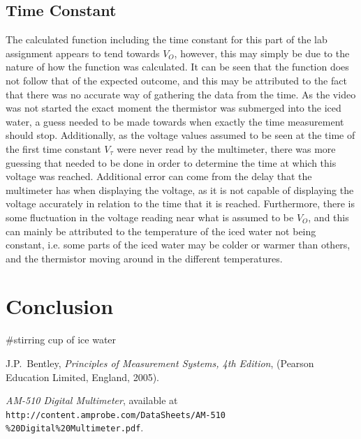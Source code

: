 \documentclass[a4,11pt]{article}
\begin{document}
\subsection{Time Constant}
The calculated function including the time constant for this part of the lab assignment appears to tend towards $V_O$, however, this may simply be due to the nature of how the function was calculated. It can be seen that the function does not follow that of the expected outcome, and this may be attributed to the fact that there was no accurate way of gathering the data from the time. As the video was not started the exact moment the thermistor was submerged into the iced water, a guess needed to be made towards when exactly the time measurement should stop. Additionally, as the voltage values assumed to be seen at the time of the first time constant $V_\tau$ were never read by the multimeter, there was more guessing that needed to be done in order to determine the time at which this voltage was reached. Additional error can come from the delay that the multimeter has when displaying the voltage, as it is not capable of displaying the voltage accurately in relation to the time that it is reached. Furthermore, there is some fluctuation in the voltage reading near what is assumed to be $V_O$, and this can mainly be attributed to the temperature of the iced water not being constant, i.e. some parts of the iced water may be colder or warmer than others, and the thermistor moving around in the different temperatures.
\section{Conclusion}
\#stirring cup of ice water
\onecolumn
\begin{thebibliography}{99}
	J.P.\ Bentley, \textit{Principles of Measurement Systems, 4th Edition},
	(Pearson Education Limited, England, 2005).
	
	 \emph{AM-510 Digital Multimeter},   available at
	\texttt{http://content.amprobe.com/DataSheets/AM-510
		\%20Digital\%20Multimeter.pdf}.	
\end{thebibliography}
\appendix
\end{document}
